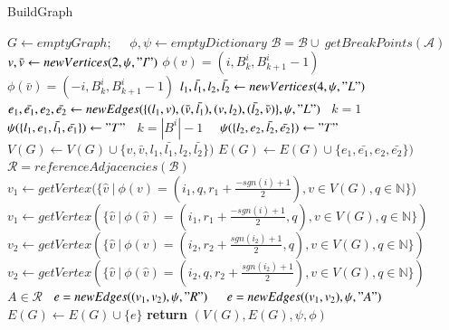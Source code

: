 \documentclass[phd,tocprelim]{cornell}
\renewcommand{\caption}[1]{\singlespacing\hangcaption{#1}\normalspacing}
\begin{document}
\begin{algorithm} \caption{BuildGraph} \label{algo:buildgraph}
    \begin{algorithmic}[1]  
          
        \State $G \gets emptyGraph;\quad$ $\phi, \psi \gets emptyDictionary$
        \State $\mathcal{B} = \mathcal{B} \cup \ getBreakPoints(\mathcal{A})$ 
        \State $v, \bar{v} \gets newVertices(2, \psi, "I")$ 
        \State $\phi(v) = (i, B^i_k, B^i_{k+1}-1)$ 
        \State $\phi(\bar{v}) = (-i, B^i_k, B^i_{k+1}-1)$
        \State $l_1, \bar{l_1}, l_2, \bar{l_2} \gets newVertices(4, \psi, "L")$ 
        \State $e_1, \bar{e_1}, e_2, \bar{e_2} \gets newEdges(\{ (l_1, v), (\bar{v},\bar{l_1}), (v, l_2), (\bar{l_2},\bar{v}) \}, \psi, "L")$ 
        \State \algorithmicif\ $k = 1$ \ \algorithmicthen\ \ $\psi(\{l_1, e_1, \bar{l_1}, \bar{e_1} \}) \gets "T"$  
        \State \algorithmicif\ $k = |B^i|-1$ \ \algorithmicthen\ $\psi(\{l_2, e_2, \bar{l_2}, \bar{e_2} \}) \gets "T"$ 
        \State $V(G) \gets V(G) \cup  \{ v, \bar{v}, l_1, \bar{l_1}, l_2, \bar{l_2} \})$
        \State $E(G) \gets E(G) \cup  \{ e_1, \bar{e_1}, e_2, \bar{e_2} \})$
        \EndFor
        \State $\mathcal{R} = referenceAdjacencies(\mathcal{B})$  
            \State $v_1 \gets getVertex(\{ \hat{v} \ | \ \phi(v) = (i_1, q, r_1+\frac{-sgn(i)+1}{2}), v \in V(G), q \in \mathbb{N}\}$)
        \Else
            \State $v_1 \gets getVertex(\{ \hat{v} \ | \ \phi(\hat{v}) = (i_1, r_1 + \frac{-sgn(i)+1}{2}, q), v \in V(G), q \in \mathbb{N}\})$
        \EndIf
            \State $v_2 \gets getVertex(\{ \hat{v} \ | \ \phi(v) = (i_2, r_2 + \frac{sgn(i_2)+1}{2}, q), v \in V(G), q \in \mathbb{N}\})$
        \Else
            \State $v_2 \gets getVertex(\{ \hat{v} \ | \ \phi(\hat{v}) = (i_2, q, r_2 + \frac{sgn(i_2)+1}{2}), v \in V(G), q \in \mathbb{N} \})$
        \EndIf
        \State \algorithmicif\ $A \in \mathcal{R}$ \algorithmicthen\ $e = newEdges((v_1, v_2), \psi, "R")$ \ \algorithmicelse \ $e = newEdges((v_1, v_2), \psi, "A")$
        \State $E(G) \gets E(G) \cup \{e\}$
        \EndFor
        \State \textbf{return} $(V(G), E(G), \psi, \phi)$ 
        \EndProcedure
    \end{algorithmic}
\end{algorithm}
\end{document}

